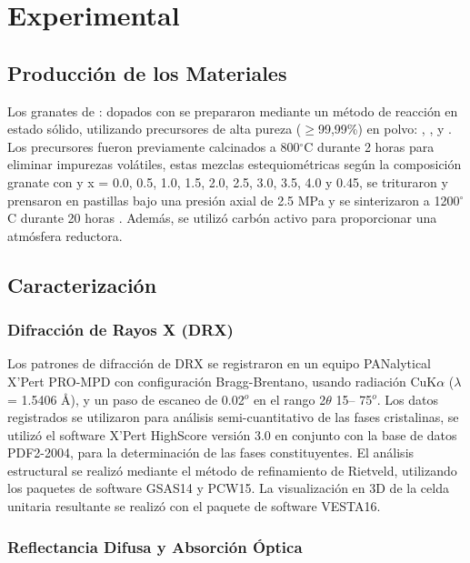 \chapter{Experimental}

\section{Producción de los Materiales }

Los granates de : dopados con  se
prepararon mediante un método de reacción en estado sólido, utilizando
precursores de alta pureza ($\geq$99,99\%) en polvo: , ,
 y . Los precursores fueron previamente calcinados a
800$^{\circ}$C 
durante 2 horas para eliminar impurezas volátiles, estas mezclas
estequiométricas según la composición granate  con y x
= 0.0, 0.5, 1.0, 1.5, 2.0, 2.5, 3.0, 3.5, 4.0 y 0.45, se trituraron y prensaron
en pastillas bajo una presión axial de 2.5 MPa y se sinterizaron a
1200$^{\circ}$C  durante 20 horas \cite{Rivera2019}. Además, se utilizó carbón
activo para proporcionar una
atmósfera reductora.

\section{Caracterización}
\subsection{Difracción de Rayos X (DRX)}
Los patrones de difracción de DRX se registraron en un equipo PANalytical
X'Pert PRO-MPD con configuración Bragg-Brentano, usando radiación CuK$\alpha$
($\lambda$ = 1.5406 \r{A}), y un paso de escaneo de 0.02$^o$
en el rango
2$\theta$ 15– 75$^o$. Los datos registrados se utilizaron para análisis
semi-cuantitativo de las fases cristalinas, se utilizó el software X'Pert
HighScore versión 3.0 en conjunto con la base de datos PDF2-2004, para la
determinación de las fases constituyentes. El análisis estructural se realizó
mediante el método de refinamiento de Rietveld, utilizando los paquetes de
software GSAS14 y PCW15. La visualización en 3D de la celda unitaria resultante
se realizó con el paquete de software VESTA16.

\subsection{Reflectancia Difusa y Absorción Óptica}

